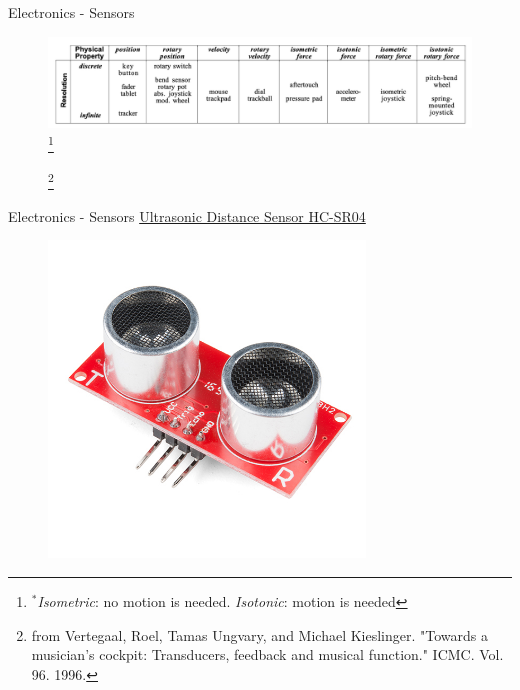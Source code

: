 \documentclass{beamer}
\newcommand\blfootnote[1]{%
  \begingroup
  \renewcommand\thefootnote{}\footnote{#1}%
  \addtocounter{footnote}{-1}%
  \endgroup
}
\begin{document}
\begin{frame}{Electronics - Sensors}
    \begin{figure}[h]
        \includegraphics[width=\textwidth]{vertegaal.png} \blfootnote{$^*$\textit{Isometric}: no motion is needed. \textit{Isotonic}: motion is needed}\blfootnote{from Vertegaal, Roel, Tamas Ungvary, and Michael Kieslinger. "Towards a musician's cockpit: Transducers, feedback and musical function." ICMC. Vol. 96. 1996.}
       
    \end{figure}
\end{frame}

\begin{frame}{Electronics - Sensors}
    \href{https://www.sparkfun.com/products/13959}{Ultrasonic Distance Sensor HC-SR04}
    \begin{figure}[h]
        \includegraphics[width=0.75\textwidth]{ultrasonic.jpg}
    \end{figure}
\end{frame}
\end{document}
